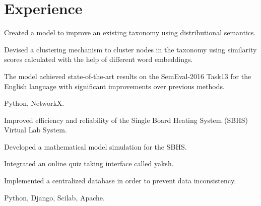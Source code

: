 
\section{Experience}

\vspace{\topsep} %
\begin{tightemize}
\item Created a model to improve an existing taxonomy using distributional semantics.
\item Devised a clustering mechanism to cluster nodes in the taxonomy using similarity scores calculated with the help of different word embeddings.
\item The model achieved state-of-the-art results on the SemEval-2016 Task13 for the English language with significant improvements over previous methods.
\item {} Python, NetworkX.
\end{tightemize}
\sectionsep

\begin{tightemize}
\item Improved efficiency and reliability of the Single Board Heating System (SBHS) Virtual Lab System.
\item Developed a mathematical model simulation for the SBHS.
\item Integrated an online quiz taking interface called yaksh.
\item Implemented a centralized database in order to prevent data inconsistency.
\item {} Python, Django, Scilab, Apache.
\end{tightemize}
\sectionsep